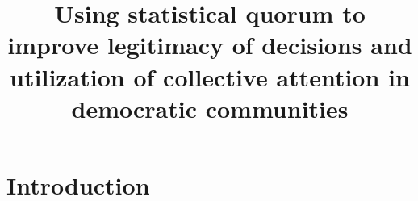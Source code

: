 \documentclass[chi_draft]{sigchi}
\def\plaintitle{Using statistical quorum to improve legitimacy of decisions and utilization of collective attention in democratic communities}
\begin{document}
\title{\plaintitle}


\maketitle

\begin{abstract}
\end{abstract}

%

\section{Introduction}
\end{document}
